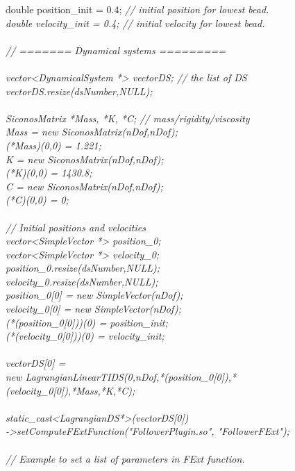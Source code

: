 \begin{tabbing}
 \> double position\_init = 0.4;\>\>\>\> \em// initial position for lowest bead.\\
 \> double velocity\_init = 0.4;\>\>\>\> \em// initial velocity for lowest bead.\\
 \\
 \> \em    // ======= Dynamical systems =========\\
 \\
 \>     vector<DynamicalSystem *> vectorDS; // the list of DS\\
 \>     vectorDS.resize(dsNumber,NULL);\\
\\
 \> SiconosMatrix *Mass, *K, *C;        // mass/rigidity/viscosity\\
 \> Mass = new SiconosMatrix(nDof,nDof);\\
 \> (*Mass)(0,0) = 1.221;\\
 \> K = new SiconosMatrix(nDof,nDof);\\
 \> (*K)(0,0) = 1430.8;\\
 \> C = new SiconosMatrix(nDof,nDof);\\
 \> (*C)(0,0) = 0;\\
\\
 \>  //  Initial positions and velocities  \\
 \>  vector<SimpleVector *> position\_0;\\
 \>  vector<SimpleVector *> velocity\_0;\\
 \>  position\_0.resize(dsNumber,NULL);\\
 \>  velocity\_0.resize(dsNumber,NULL);\\
 \>  position\_0[0] = new SimpleVector(nDof);\\
 \>  velocity\_0[0] = new SimpleVector(nDof);\\
 \>  (*(position\_0[0]))(0) = position\_init;\\
 \>  (*(velocity\_0[0]))(0) = velocity\_init;\\
 \\
 \>  vectorDS[0] =\\ \>
 new LagrangianLinearTIDS(0,nDof,*(position\_0[0]),*(velocity\_0[0]),*Mass,*K,*C);\\
\\
 \> static\_cast<LagrangianDS*>(vectorDS[0])
 \\ \>\>\>->setComputeFExtFunction("FollowerPlugin.so", "FollowerFExt");\\
\\
 \> // Example to set a list of parameters in FExt function.\\

\end{tabbing}
